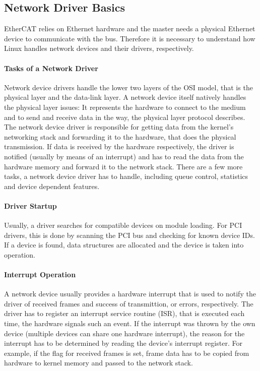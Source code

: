 \documentclass[a4paper,12pt,BCOR6mm,bibtotoc,idxtotoc]{scrbook}
\begin{document}

\subsection{Network Driver Basics}
\label{sec:networkdrivers}

EtherCAT relies on Ethernet hardware and the master needs a physical
Ethernet device to communicate with the bus. Therefore it is necessary
to understand how Linux handles network devices and their drivers,
respectively.

\paragraph{Tasks of a Network Driver}

Network device drivers handle the lower two layers of the OSI model,
that is the physical layer and the data-link layer. A network device
itself natively handles the physical layer issues: It represents the
hardware to connect to the medium and to send and receive data in the
way, the physical layer protocol describes. The network device driver
is responsible for getting data from the kernel's networking stack and
forwarding it to the hardware, that does the physical transmission.
If data is received by the hardware respectively, the driver is
notified (usually by means of an interrupt) and has to read the data
from the hardware memory and forward it to the network stack. There
are a few more tasks, a network device driver has to handle, including
queue control, statistics and device dependent features.

\paragraph{Driver Startup}

Usually, a driver searches for compatible devices on module loading.
For PCI drivers, this is done by scanning the PCI bus and checking for
known device IDs. If a device is found, data structures are allocated
and the device is taken into operation.

\paragraph{Interrupt Operation}

A network device usually provides a hardware interrupt that is used to
notify the driver of received frames and success of transmittion, or
errors, respectively. The driver has to register an interrupt service
routine (ISR),
that is executed each time, the hardware signals such an event. If the
interrupt was thrown by the own device (multiple devices can share one
hardware interrupt), the reason for the interrupt has to be determined
by reading the device's interrupt register. For example, if the flag
for received frames is set, frame data has to be copied from hardware
to kernel memory and passed to the network stack.
\end{document}
